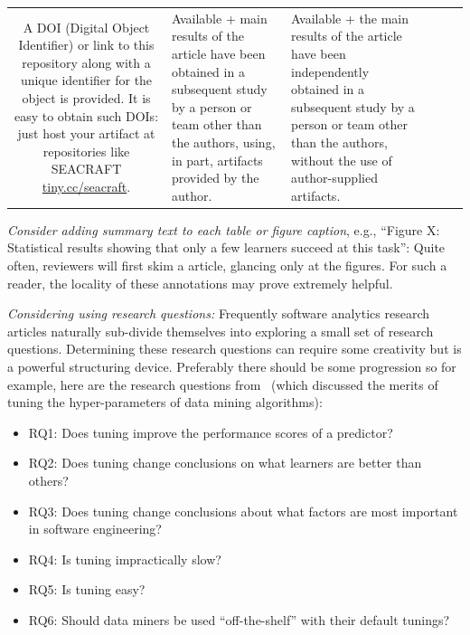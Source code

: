 \documentclass[preprint,10pt]{elsarticle}
\newcommand{\bi}{\begin{itemize}}
\newcommand{\ei}{\end{itemize}}
\begin{document}
\begin{table}[!t]
\begin{tabular}{c|P{0.6in}|P{0.8in}|P{0.9in}|P{0.6in}|P{0.6in}}
A DOI (Digital Object Identifier) or link to this repository along with a unique identifier for the object is provided. It is easy to obtain such DOIs: just host your artifact at repositories like SEACRAFT
\href{https://tiny.cc/seacraft}{tiny.cc/seacraft}. &
Available + main results of the article have been obtained in a subsequent study by a person or team other than the authors, using, in part, artifacts provided by the author.  &
Available + the main results of the article have been independently obtained in a subsequent study by a person or team other than the authors, without the use of author-supplied artifacts. \\ 
\end{tabular}
\end{table}

{\em Consider adding summary text to each table or figure caption}, e.g., ``Figure X: Statistical results showing that only a few learners succeed at this task'':  Quite often, reviewers will first skim  a article, glancing only at the figures. For such a reader, the locality of these annotations may prove extremely helpful.  

{\em Considering using research questions:} Frequently software analytics research articles naturally sub-divide themselves into exploring a small set of research questions. Determining these research questions can require some creativity but is a powerful structuring device. Preferably there should be some progression so for example, here are the research questions from~\cite{fu2016} (which discussed the merits of tuning the hyper-parameters of data mining algorithms):

\bi
\item RQ1: Does tuning improve the performance scores of a predictor? 
\item RQ2: Does tuning change conclusions on what learners are better than others? 
\item RQ3: Does tuning change conclusions about what factors are most important in software engineering? 
\item RQ4: Is tuning impractically slow? 
\item RQ5:
Is tuning easy?
\item RQ6: Should data miners be used ``off-the-shelf'' with their default tunings? 
\ei

\end{document}
